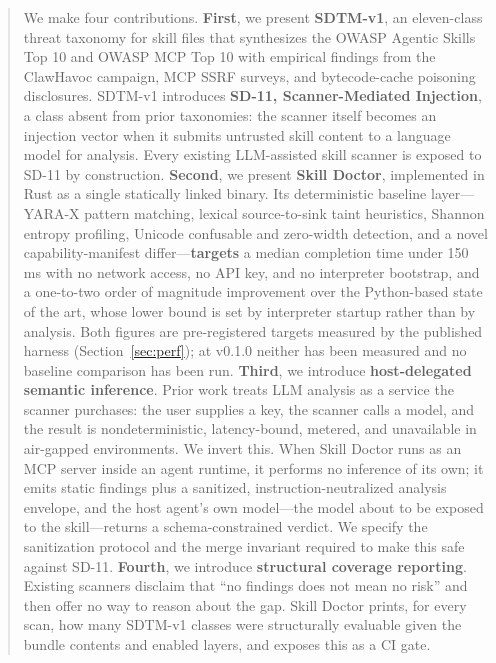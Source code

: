 \documentclass[11pt]{article}
\begin{document}
\begin{abstract}
\smallskip\noindent
We make four contributions. \textbf{First}, we present \textbf{SDTM-v1}, an
eleven-class threat taxonomy for skill files that synthesizes the OWASP Agentic
Skills Top 10 and OWASP MCP Top 10 with empirical findings from the ClawHavoc
campaign, MCP SSRF surveys, and bytecode-cache poisoning disclosures. SDTM-v1
introduces \textbf{SD-11, Scanner-Mediated Injection}, a class absent from
prior taxonomies: the scanner itself becomes an injection vector when it
submits untrusted skill content to a language model for analysis. Every
existing LLM-assisted skill scanner is exposed to SD-11 by construction.
\textbf{Second}, we present \textbf{Skill Doctor}, implemented in Rust as a
single statically linked binary. Its deterministic baseline layer---YARA-X
pattern matching, lexical source-to-sink taint heuristics, Shannon entropy
profiling, Unicode confusable and zero-width detection, and a novel
capability-manifest differ---\textbf{targets} a median completion time under
150\,ms with no network access, no API key, and no interpreter bootstrap, and a
one-to-two order of magnitude improvement over the Python-based state of the
art, whose lower bound is set by interpreter startup rather than by analysis.
Both figures are pre-registered targets measured by the published harness
(Section~\ref{sec:perf}); at v0.1.0 neither has been measured and no baseline
comparison has been run. \textbf{Third}, we introduce \textbf{host-delegated
semantic inference}. Prior work treats LLM analysis as a service the scanner
purchases: the user supplies a key, the scanner calls a model, and the result
is nondeterministic, latency-bound, metered, and unavailable in air-gapped
environments. We invert this. When Skill Doctor runs as an MCP server inside an
agent runtime, it performs no inference of its own; it emits static findings
plus a sanitized, instruction-neutralized analysis envelope, and the host
agent's own model---the model about to be exposed to the skill---returns a
schema-constrained verdict. We specify the sanitization protocol and the merge
invariant required to make this safe against SD-11. \textbf{Fourth}, we
introduce \textbf{structural coverage reporting}. Existing scanners disclaim
that ``no findings does not mean no risk'' and then offer no way to reason
about the gap. Skill Doctor prints, for every scan, how many SDTM-v1 classes
were structurally evaluable given the bundle contents and enabled layers, and
exposes this as a CI gate.


\end{abstract}
\end{document}
